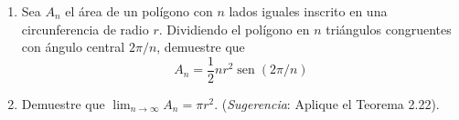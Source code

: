 \item 
\begin{enumerate}
    \item[(a)] Sea $A_n$ el área de un polígono con $n$ lados iguales inscrito en una circunferencia de radio $r$. Dividiendo el polígono en $n$ triángulos congruentes con ángulo central $2\pi/n$, demuestre que
    $$A_n = \frac{1}{2}nr^2\operatorname{sen}(2\pi/n)$$
    \item[(b)] Demuestre que $\lim_{n \to \infty} A_n = \pi r^2$. (\textit{Sugerencia}: Aplique el Teorema 2.22).
\end{enumerate}
